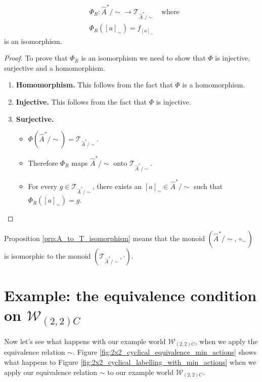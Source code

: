 \begin{proposition}\label{prp:A_to_T_isomorphism}
	\begin{equation}
		\begin{aligned}
			 & \Phi_{R} : \hat{A}^{\ast}/\sim \to \mathcal{T}_{\hat{A}^{\ast}/\sim} \quad \text{where} \\
			 & \Phi_{R}([a]_{\sim}) = f_{[a]_{\sim}}
		\end{aligned}
	\end{equation}
	is an isomorphism.
\end{proposition}
\begin{proof}
	To prove that $\Phi_{R}$ is an isomorphism we need to show that $\Phi$ is injective, surjective and a homomorphism.
	\begin{enumerate}[(1)]
		\item \textbf{Homomorphism.}
		      This follows from the fact that $\Phi$ is a homomorphism.

		\item \textbf{Injective.}
		      This follows from the fact that $\Phi$ is injective.

		\item \textbf{Surjective.}
		      \begin{itemize}
			      \item $\Phi(\hat{A}^{\ast}/\sim) = \mathcal{T}_{\hat{A}^{\ast}/\sim}$.
			      \item Therefore $\Phi_{R}$ maps $\hat{A}^{\ast}/\sim$ onto $\mathcal{T}_{\hat{A}^{\ast}/\sim}$.
			      \item For every $g \in \mathcal{T}_{\hat{A}^{\ast}/\sim}$, there exists an $[a]_{\sim} \in \hat{A}^{\ast}/\sim$ such that $\Phi_{R}([a]_{\sim}) = g$.
		      \end{itemize}
	\end{enumerate}
\end{proof}

Proposition \ref{prp:A_to_T_isomorphism} means that the monoid $(\hat{A}^{\ast}/\sim, \circ_{\sim})$ is isomorphic to the monoid $(\mathcal{T}_{\hat{A}^{\ast}/\sim}, \cdot)$.


\section{
Example: the equivalence condition on \texorpdfstring{$\mathscr{W}_{(2,2)C}$}{example world}
}\label{sec:the_equivalence_condition_on_example_world}

Now let's see what happens with our example world $\mathscr{W}_{(2,2)C}$, when we apply the equivalence relation $\sim$.
Figure \ref{fig:2x2_cyclical_equivalence_min_actions} shows what happens to Figure \ref{fig:2x2_cyclical_labelling_with_min_actions} when we apply our equivalence relation $\sim$ to our example world $\mathscr{W}_{(2,2)C}$.


